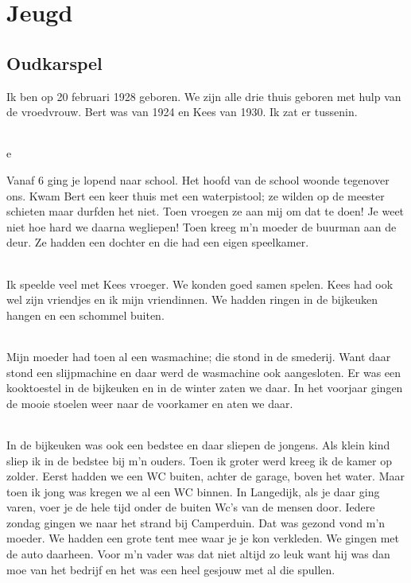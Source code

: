 \part*{Jeugd}

\chapter{Oudkarspel} 

Ik ben op 20 februari 1928 geboren. We zijn alle drie thuis geboren met hulp van de vroedvrouw. Bert was van 1924 en Kees van 1930. Ik zat er tussenin.

\paragraph{}e

Vanaf 6 ging je lopend naar school. Het hoofd van de school woonde tegenover ons. Kwam Bert een keer thuis met een waterpistool; ze wilden op de meester schieten maar durfden het niet. Toen vroegen ze aan mij om dat te doen! Je weet niet hoe hard we daarna wegliepen! Toen kreeg m’n moeder de buurman aan de deur. Ze hadden een dochter en die had een eigen speelkamer.

\paragraph{}

Ik speelde veel met Kees vroeger. We konden goed samen spelen. Kees had ook wel zijn vriendjes en ik mijn vriendinnen. We hadden ringen in de bijkeuken hangen en een schommel buiten. 

\paragraph{}

Mijn moeder had toen al een wasmachine; die stond in de smederij. Want daar stond een slijpmachine en daar werd de wasmachine ook aangesloten. Er was een kooktoestel in de bijkeuken en in de winter zaten we daar. In het voorjaar gingen de mooie stoelen weer naar de voorkamer en aten we daar.

\paragraph{}

In de bijkeuken was ook een bedstee en daar sliepen de jongens.
Als klein kind sliep ik in de bedstee bij m’n ouders. Toen ik groter werd kreeg ik de kamer op zolder.
Eerst hadden we een WC buiten, achter de garage, boven het water. Maar toen ik jong was kregen we al een WC binnen. In Langedijk, als je daar ging varen, voer je de hele tijd onder de buiten Wc’s van de mensen door.
Iedere zondag gingen we naar het strand bij Camperduin. Dat was gezond vond m’n moeder. We hadden een grote tent mee waar je je kon verkleden. We gingen met de auto daarheen. Voor m’n vader was dat niet altijd zo leuk want hij was dan moe van het bedrijf en het was een heel gesjouw met al die spullen.

